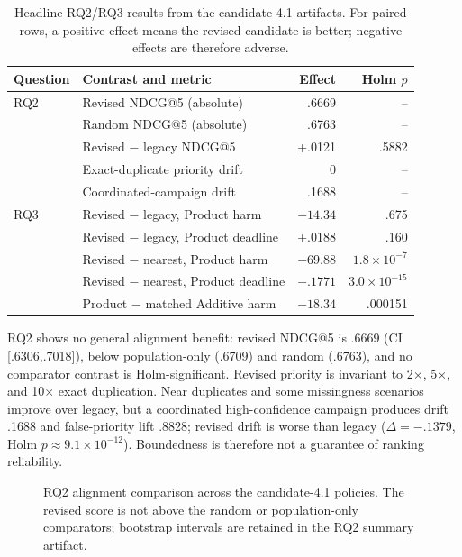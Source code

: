 \documentclass[runningheads]{llncs}
\begin{document}
\begin{table}[t]
\centering\scriptsize
\caption{Headline RQ2/RQ3 results from the candidate-4.1 artifacts. For paired
rows, a positive effect means the revised candidate is better; negative effects
are therefore adverse.}
\label{tab:stress-results}
\begin{tabular}{llrr}
\toprule
Question & Contrast and metric & Effect & Holm $p$\\
\midrule
RQ2 & Revised NDCG@5 (absolute) & .6669 & --\\
    & Random NDCG@5 (absolute) & .6763 & --\\
    & Revised $-$ legacy NDCG@5 & +.0121 & .5882\\
    & Exact-duplicate priority drift & 0 & --\\
    & Coordinated-campaign drift & .1688 & --\\
RQ3 & Revised $-$ legacy, Product harm & $-14.34$ & .675\\
    & Revised $-$ legacy, Product deadline & +.0188 & .160\\
    & Revised $-$ nearest, Product harm & $-69.88$ & $1.8\times10^{-7}$\\
    & Revised $-$ nearest, Product deadline & $-.1771$ & $3.0\times10^{-15}$\\
    & Product $-$ matched Additive harm & $-18.34$ & .000151\\
\bottomrule
\end{tabular}
\end{table}

RQ2 shows no general alignment benefit: revised NDCG@5 is .6669 (CI
[.6306,.7018]), below population-only (.6709) and random (.6763), and no
comparator contrast is Holm-significant. Revised priority is invariant to
2$\times$, 5$\times$, and 10$\times$ exact duplication. Near duplicates and
some missingness scenarios improve over legacy, but a coordinated
high-confidence campaign produces drift .1688 and false-priority lift .8828;
revised drift is worse than legacy ($\Delta=-.1379$, Holm
$p\approx9.1\times10^{-12}$). Boundedness is therefore not a guarantee of
ranking reliability.

\begin{figure}[t]
\centering
{}
\caption{RQ2 alignment comparison across the candidate-4.1 policies. The
revised score is not above the random or population-only comparators; bootstrap
intervals are retained in the RQ2 summary artifact.}
\label{fig:rq2-ndcg}
\end{figure}
\end{document}
